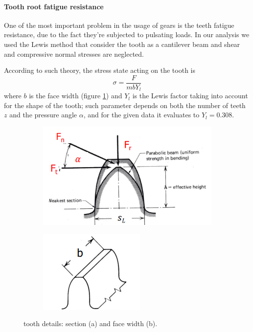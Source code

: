 	\paragraph{Tooth root fatigue resistance}	One of the most important problem in the usage of gears is the teeth fatigue resistance, due to the fact they're subjected to pulsating loads.  
	In our analysis we used the Lewis method that consider the tooth as a cantilever beam and shear and compressive normal stresses are neglected.
	
	According to such theory, the stress state acting on the tooth is
	\[ \sigma = \frac{F}{mb Y_l}\]
	where $b$ is the face width (figure \ref{fig:tooth}) and $Y_l$ is the Lewis factor taking into account for the shape of the tooth; such parameter depends on both the number of teeth $z$ and the pressure angle $\alpha$, and for the given data it evaluates to $Y_l = 0.308$.
	\begin{figure}[bt]
	\begin{subfigure}{.5\textwidth}
		\centering
		\includegraphics[scale=0.5]{Images/toothgear1.png}
		\caption{}
	\end{subfigure}%
	\begin{subfigure}{.5\textwidth}
		\centering
		\includegraphics[scale=0.6]{Images/toothgear2.png}
		\caption{}
	\end{subfigure}
	\caption{tooth details: section (a) and face width (b).}
	\label{fig:tooth}
	\end{figure}
	
